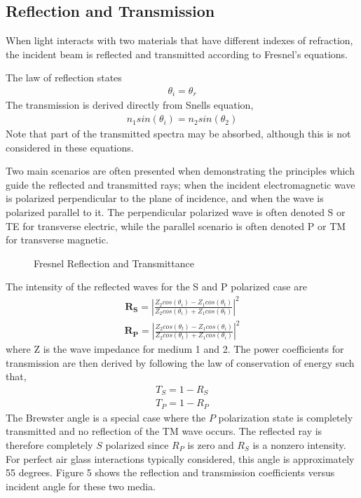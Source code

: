 \subsection{Reflection and Transmission}

When light interacts with two materials that have different indexes of refraction, the incident beam is reflected and transmitted according to Fresnel’s equations.

The law of reflection states
%
\begin{align}
    \theta_i = \theta_r
\end{align}
%
The transmission is derived directly from Snells equation,
%
\begin{align}
    n_1sin(\theta_i) = n_2sin(\theta_2)
\end{align}
%
Note that part of the transmitted spectra may be absorbed, although this is not considered in these equations.

Two main scenarios are often presented when demonstrating the principles which guide the reflected and transmitted rays; when the incident electromagnetic wave is polarized perpendicular to the plane of incidence, and when the wave is polarized parallel to it.  The perpendicular polarized wave is often denoted S or TE for transverse electric, while the parallel scenario is often denoted P or TM for transverse magnetic.

\begin{figure}[!htb]
    \begin{center}
    \end{center}
    \caption{Fresnel Reflection and Transmittance}
    \label{fig:polarization}
\end{figure}

The intensity of the reflected waves for the S and P polarized case are
%
\begin{align}
    \mathbf{R_S} = |\frac{Z_2cos(\theta_i)-Z_1cos(\theta_t)}{Z_2cos(\theta_i)+Z_1cos(\theta_t)}|^2
\end{align}
\begin{align}
    \mathbf{R_P} = |\frac{Z_2cos(\theta_t)-Z_1cos(\theta_i)}{Z_2cos(\theta_t)+Z_1cos(\theta_i)}|^2
\end{align}
%
where Z is the wave impedance for medium 1 and 2.  The power coefficients for transmission are then derived by following the law of conservation of energy such that,
%
\begin{align}
    T_S = 1 - R_S \\
    T_P = 1 - R_P
\end{align}
%
The Brewster angle is a special case where the $P$ polarization state is completely transmitted and no reflection of the TM wave occurs.  The reflected ray is therefore completely $S$ polarized since $R_P$ is zero and $R_S$ is a nonzero intensity.  For perfect air glass interactions typically considered, this angle is approximately 55 degrees.  Figure 5 shows the reflection and transmission coefficients versus incident angle for these two media.

